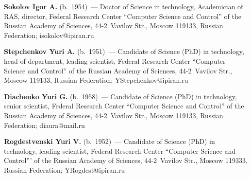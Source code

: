 \noindent
\textbf{Sokolov Igor A.} (b.\ 1954)~--- Doctor of Science in technology, Academician of RAS, director, 
Federal Research Center ``Computer Science and Control'' of the Russian Academy of Sciences,  
44-2~Vavilov Str., Moscow 119133, Russian Federation; \mbox{isokolov@ipiran.ru}

\vspace*{3pt}

\noindent
\textbf{Stepchenkov Yuri A.} (b.\ 1951)~--- Candidate of Science (PhD) in technology, head of 
department, leading scientist, Federal Research Center ``Computer Science and Control'' of the Russian 
Academy of Sciences, 44-2~Vavilov Str., Moscow 119133, Russian Federation; 
\mbox{YStepchenkov@ipiran.ru}

\vspace*{3pt}

\noindent
\textbf{Diachenko Yuri G.} (b.\ 1958)~--- Candidate of Science (PhD) in technology, senior scientist, 
Federal Research Center ``Computer Science and Control'' of the Russian Academy of Sciences,  
44-2~Vavilov Str., Moscow 119133, Russian Federation; \mbox{diaura@mail.ru}

\vspace*{3pt}

\noindent
\textbf{Rogdestvenski Yuri V.} (b.\ 1952)~--- Candidate of Science (PhD) in technology, leading 
scientist, Federal Research Center ``Computer Science and Control''' of the Russian Academy of 
Sciences, 44-2~Vavilov Str., Moscow 119333, Russian Federation; \mbox{YRogdest@ipiran.ru}

 

\label{end\stat}

\renewcommand{\bibname}{\protect\rm Литература}    